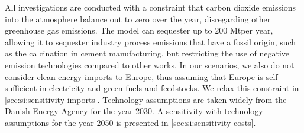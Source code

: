 All investigations are conducted with a constraint that carbon dioxide emissions
into the atmosphere balance out to zero over the year, disregarding other
greenhouse gas emissions. The model can sequester up to 200 Mt\co per year,
allowing it to sequester industry process emissions that have a fossil origin,
such as the calcination in cement manufacturing, but restricting the use of
negative emission technologies compared to other works.
\cite{blancoPotentialHydrogen2018} In our scenarios, we also do not consider
clean energy imports to Europe, thus assuming that Europe is self-sufficient in
electricity and green fuels and feedstocks. We relax this constraint in
\cref{sec:si:sensitivity-imports}. Technology assumptions are taken widely from
the Danish Energy Agency for the year 2030.\cite{DEA} A sensitivity with
technology assumptions for the year 2050 is presented in \cref{sec:si:sensitivity-costs}.
